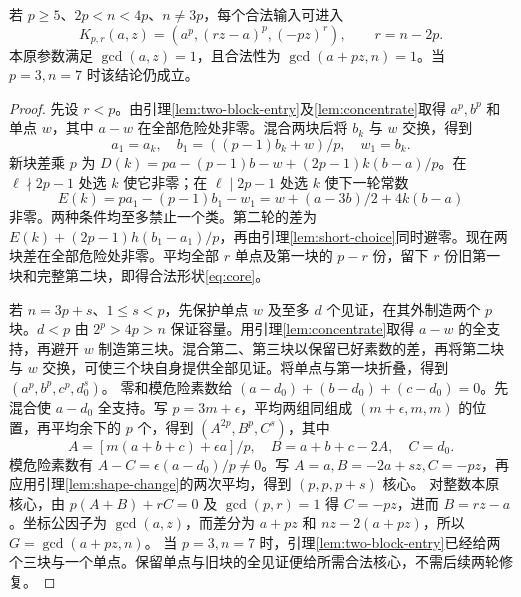 \begin{proposition}\label{prop:entry}
若 $p\ge5$、$2p<n<4p$、$n\ne3p$，每个合法输入可进入
\begin{equation}\label{eq:core}
K_{p,r}(a,z)=(a^p,(rz-a)^p,(-pz)^r),\qquad r=n-2p.
\end{equation}
本原参数满足 $\gcd(a,z)=1$，且合法性为 $\gcd(a+pz,n)=1$。当 $p=3,n=7$ 时该结论仍成立。
\end{proposition}
\begin{proof}
先设 $r<p$。由引理\ref{lem:two-block-entry}及\ref{lem:concentrate}取得 $a^p,b^p$ 和单点 $w$，其中 $a-w$ 在全部危险处非零。混合两块后将 $b_k$ 与 $w$ 交换，得到
\[
a_1=a_k,\quad b_1=((p-1)b_k+w)/p,\quad w_1=b_k.
\]
新块差乘 $p$ 为 $D(k)=pa-(p-1)b-w+(2p-1)k(b-a)/p$。在 $\ell\nmid2p-1$ 处选 $k$ 使它非零；在 $\ell\mid2p-1$ 处选 $k$ 使下一轮常数
\[E(k)=pa_1-(p-1)b_1-w_1=w+(a-3b)/2+4k(b-a)
\]
非零。两种条件均至多禁止一个类。第二轮的差为 $E(k)+(2p-1)h(b_1-a_1)/p$，再由引理\ref{lem:short-choice}同时避零。现在两块差在全部危险处非零。平均全部 $r$ 单点及第一块的 $p-r$ 份，留下 $r$ 份旧第一块和完整第二块，即得合法形状\eqref{eq:core}。

若 $n=3p+s$、$1\le s<p$，先保护单点 $w$ 及至多 $d$ 个见证，在其外制造两个 $p$ 块。$d<p$ 由 $2^p>4p>n$ 保证容量。用引理\ref{lem:concentrate}取得 $a-w$ 的全支持，再避开 $w$ 制造第三块。混合第二、第三块以保留已好素数的差，再将第二块与 $w$ 交换，可使三个块自身提供全部见证。将单点与第一块折叠，得到 $(a^p,b^p,c^p,d_0^s)$。
零和模危险素数给 $(a-d_0)+(b-d_0)+(c-d_0)=0$。先混合使 $a-d_0$ 全支持。写 $p=3m+\epsilon$，平均两组同组成 $(m+\epsilon,m,m)$ 的位置，再平均余下的 $p$ 个，得到 $(A^{2p},B^p,C^s)$，其中
\[
A=[m(a+b+c)+\epsilon a]/p,\quad B=a+b+c-2A,\quad C=d_0.
\]
模危险素数有 $A-C=\epsilon(a-d_0)/p\ne0$。写 $A=a,B=-2a+sz,C=-pz$，再应用引理\ref{lem:shape-change}的两次平均，得到 $(p,p,p+s)$ 核心。
对整数本原核心，由 $p(A+B)+rC=0$ 及 $\gcd(p,r)=1$ 得 $C=-pz$，进而 $B=rz-a$。坐标公因子为 $\gcd(a,z)$，而差分为 $a+pz$ 和 $nz-2(a+pz)$，所以 $G=\gcd(a+pz,n)$。
当 $p=3,n=7$ 时，引理\ref{lem:two-block-entry}已经给两个三块与一个单点。保留单点与旧块的全见证便给所需合法核心，不需后续两轮修复。
\end{proof}
